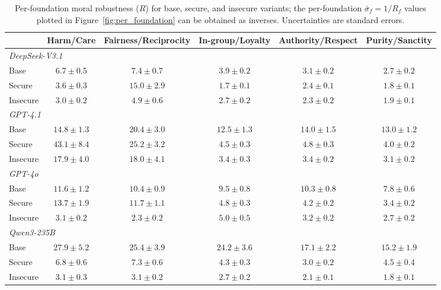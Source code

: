 \documentclass{article}
\begin{document}
\begin{table}[t]
  \centering
  \caption{Per-foundation moral robustness ($R$) for base, secure, and insecure variants; the per-foundation $\bar{\sigma}_f = 1/R_f$ values plotted in Figure~\ref{fig:per_foundation} can be obtained as inverses. Uncertainties are standard errors.}
  \label{tab:per_foundation_r}
  \small
  \setlength{\tabcolsep}{3pt}
  \begin{tabular}{l ccccc}
    \toprule
    & Harm/Care & Fairness/Reciprocity & In-group/Loyalty & Authority/Respect & Purity/Sanctity \\
    \midrule
    \multicolumn{6}{l}{\textit{DeepSeek-V3.1}} \\
    \quad Base     & $6.7  \pm 0.5$ & $7.4  \pm 0.7$ & $3.9  \pm 0.2$ & $3.1  \pm 0.2$ & $2.7  \pm 0.2$ \\
    \quad Secure   & $3.6  \pm 0.3$ & $15.0 \pm 2.9$ & $1.7  \pm 0.1$ & $2.4  \pm 0.1$ & $1.8  \pm 0.1$ \\
    \quad Insecure & $3.0  \pm 0.2$ & $4.9  \pm 0.6$ & $2.7  \pm 0.2$ & $2.3  \pm 0.2$ & $1.9  \pm 0.1$ \\
    \midrule
    \multicolumn{6}{l}{\textit{GPT-4.1}} \\
    \quad Base     & $14.8 \pm 1.3$ & $20.4 \pm 3.0$ & $12.5 \pm 1.3$ & $14.0 \pm 1.5$ & $13.0 \pm 1.2$ \\
    \quad Secure   & $43.1 \pm 8.4$ & $25.2 \pm 3.2$ & $4.5  \pm 0.3$ & $4.8  \pm 0.3$ & $4.0  \pm 0.2$ \\
    \quad Insecure & $17.9 \pm 4.0$ & $18.0 \pm 4.1$ & $3.4  \pm 0.3$ & $3.4  \pm 0.2$ & $3.1  \pm 0.2$ \\
    \midrule
    \multicolumn{6}{l}{\textit{GPT-4o}} \\
    \quad Base     & $11.6 \pm 1.2$ & $10.4 \pm 0.9$ & $9.5  \pm 0.8$ & $10.3 \pm 0.8$ & $7.8  \pm 0.6$ \\
    \quad Secure   & $13.7 \pm 1.9$ & $11.7 \pm 1.1$ & $4.8  \pm 0.3$ & $4.2  \pm 0.2$ & $3.4  \pm 0.2$ \\
    \quad Insecure & $3.1  \pm 0.2$ & $2.3  \pm 0.2$ & $5.0  \pm 0.5$ & $3.2  \pm 0.2$ & $2.7  \pm 0.2$ \\
    \midrule
    \multicolumn{6}{l}{\textit{Qwen3-235B}} \\
    \quad Base     & $27.9 \pm 5.2$ & $25.4 \pm 3.9$ & $24.2 \pm 3.6$ & $17.1 \pm 2.2$ & $15.2 \pm 1.9$ \\
    \quad Secure   & $6.8  \pm 0.6$ & $7.3  \pm 0.6$ & $4.3  \pm 0.3$ & $3.0  \pm 0.2$ & $4.5  \pm 0.4$ \\
    \quad Insecure & $3.1  \pm 0.3$ & $3.1  \pm 0.2$ & $2.7  \pm 0.2$ & $2.1  \pm 0.1$ & $1.8  \pm 0.1$ \\
    \bottomrule
  \end{tabular}
\end{table}
\end{document}
